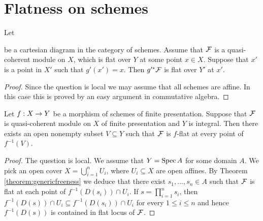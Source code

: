 \section{Flatness on schemes}
\begin{proposition}
Let
\begin{center}
\end{center}
be a cartesian diagram in the category of schemes. Assume that ${\mathcal F}$ is a quasi-coherent module on $X$, which is flat over $Y$ at some point $x\in X$. Suppose that $x'$ is a point in $X'$ such that $g'(x')=x$. Then $g'^*{\mathcal F}$ is flat over $Y'$ at $x'$.
\end{proposition}
\begin{proof}
Since the question is local we may assume that all schemes are affine. In this case this is proved by an easy argument in commutative algebra.
\end{proof}
\begin{theorem}\label{theorem:genericflatness}
Let $f:X\rightarrow Y$ be a morphism of schemes of finite presentation. Suppose that ${\mathcal F}$ is quasi-coherent module on $X$ of finite presentation and $Y$ is integral. Then there exists an open nonempty subset $V\subseteq Y$ such that ${\mathcal F}$ is $f$-flat at every point of $f^{-1}(V)$.
\end{theorem}
\begin{proof}
The question is local. We assume that $Y=\mathrm{Spec}\, A$ for some domain $A$. We pick an open cover $X=\bigcup^n_{i=1}U_i$, where $U_i\subseteq X$ are open affines. By Theorem \ref{theorem:genericfreeness} we deduce that there exist $s_1,...,s_n\in A$ such that ${\mathcal F}$ is flat at each point of $f^{-1}\left(D(s_i)\right)\cap U_i$. If $s=\prod^n_{i=1}s_i$, then $f^{-1}\left(D(s)\right)\cap U_i\subseteq f^{-1}\left(D(s_i)\right)\cap U_i$ for every $1\leq i\leq n$ and hence $f^{-1}(D(s))$ is contained in flat locus of ${\mathcal F}$.
\end{proof}
